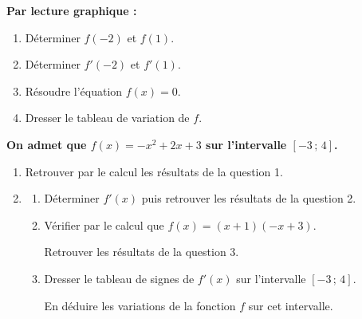 \documentclass[10pt]{article}
\begin{document}
\textbf{Par lecture graphique :}
\begin{enumerate}
\item Déterminer $f(-2)$ et $f(1)$.
\item Déterminer $f'(-2)$ et $f'(1)$.
\item Résoudre l'équation $f(x)=0$.
\item Dresser le tableau de variation de $f$.
\end{enumerate}

\textbf{On admet que $f(x)=-x^2+2x+3$ sur l'intervalle $[-3\,;\,4]$.}
\begin{enumerate}[resume]
\item Retrouver par le calcul les résultats de la question 1.
\item
\begin{enumerate}[label=\alph*)]
\item Déterminer $f'(x)$ puis retrouver les résultats de la question 2.
\item Vérifier par le calcul que $f(x)=(x+1)(-x+3)$.\par Retrouver les résultats de la question 3.
\item Dresser le tableau de signes de $f'(x)$ sur l'intervalle $[-3\,;\,4]$.\par En déduire les variations de la fonction $f$ sur cet intervalle.
\end{enumerate}
\end{enumerate}

\bigskip
\end{document}
